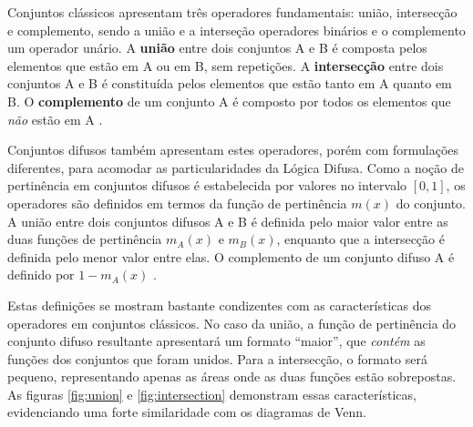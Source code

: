 \documentclass[12pt]{article}
\begin{document}
Conjuntos clássicos apresentam três operadores fundamentais: união, intersecção e complemento, sendo a união e a interseção operadores binários e o complemento um operador unário. A \textbf{união} entre dois conjuntos A e B é composta pelos elementos que estão em A ou em B, sem repetições. A \textbf{intersecção} entre dois conjuntos A e B é constituída pelos elementos que estão tanto em A quanto em B. O \textbf{complemento} de um conjunto A é composto por todos os elementos que \textit{não} estão em A \cite{Houston2009}.

Conjuntos difusos também apresentam estes operadores, porém com formulações diferentes, para acomodar as particularidades da Lógica Difusa. Como a noção de pertinência em conjuntos difusos é estabelecida por valores no intervalo $[0, 1]$, os operadores são definidos em termos da função de pertinência $m(x)$ do conjunto. A união entre dois conjuntos difusos A e B é definida pelo maior valor entre as duas funções de pertinência $m_{A}(x)$ e $m_{B}(x)$, enquanto que a intersecção é definida pelo menor valor entre elas. O complemento de um conjunto difuso A é definido por $1 - m_{A}(x)$ \cite{Zadeh1965}.

Estas definições se mostram bastante condizentes com as características dos operadores em conjuntos clássicos. No caso da união, a função de pertinência do conjunto difuso resultante apresentará um formato ``maior'', que \textit{contém} as funções dos conjuntos que foram unidos. Para a intersecção, o formato será pequeno, representando apenas as áreas onde as duas funções estão sobrepostas. As figuras \ref{fig:union} e \ref{fig:intersection} demonstram essas características, evidenciando uma forte similaridade com os diagramas de Venn.
\end{document}
